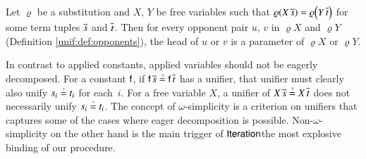 \begin{lemma}[$\jp L{3\text{ (1)}}$]\label{lem:principal-lemma}Let $\varrho$ be a substitution
    and $X$, $Y$ be free variables such that $\varrho\left(X\,\seq s\right)=\varrho\left(Y\,\seq t\right)$
    for some term tuples $\overline{s}$ and $\overline{t}$. Then for every opponent
    pair $u$, $v$ in $\varrho X$ and $\varrho Y$
    (Definition \ref{unif:def:opponents}), the head of $u$ or $v$ is a parameter
    of $\varrho X$ or $\varrho Y$.
    \end{lemma}
  
  In contrast to applied constants, applied variables should not be eagerly decomposed.
  For a constant $\mathsf{f}$, if $\cst{f}\,\seq s \unif \cst{f}\,\seq t$ has a unifier,
  that unifier must clearly also unify $s_{i} \unif t_{i}$ for each~$i$. 
  For a free variable $X$, a unifier of $X\,\seq s \unif X\,\seq t$ does not necessarily
  unify $s_{i} \unif t_{i}$.
  The concept of $\omega$-simplicity is
  a criterion on unifiers that captures some of the cases where eager decomposition is possible.
  Non-$\omega$-simplicity
  on the other hand is the main trigger of $\textsf{Iteration}$\textemdash the
  most explosive binding of our procedure.
  
